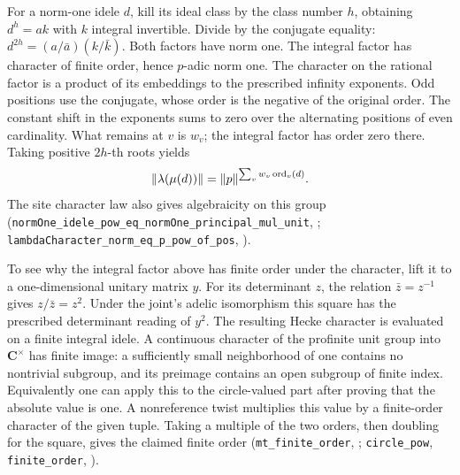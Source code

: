 For a norm-one idele \(d\), kill its ideal class by the class number \(h\), obtaining \(d^h=a k\) with \(k\) integral invertible. Divide by the conjugate equality:
\(d^{2h}=(a/\bar a)(k/\bar k)\). Both factors have norm one. The integral factor has character of finite order, hence \(p\)-adic norm one. The character on the rational factor is a product of its embeddings to the prescribed infinity exponents. Odd positions use the conjugate, whose order is the negative of the original order. The constant shift in the exponents sums to zero over the alternating positions of even cardinality. What remains at \(v\) is \(w_v\); the integral factor has order zero there. Taking positive \(2h\)-th roots yields
\[
\lVert\lambda(\mu(d))\rVert=\lVert p\rVert^{\sum_v w_v\,{\rm ord}_v(d)} .
\]
The site character law also gives algebraicity on this group (\nolinkurl{normOne_idele_pow_eq_normOne_principal_mul_unit}, ; \nolinkurl{lambdaCharacter_norm_eq_p_pow_of_pos}, ).

To see why the integral factor above has finite order under the character, lift it to a one-dimensional unitary matrix \(y\). For its determinant \(z\), the relation \(\bar z=z^{-1}\) gives \(z/\bar z=z^2\). Under the joint's adelic isomorphism this square has the prescribed determinant reading of \(y^2\). The resulting Hecke character is evaluated on a finite integral idele. A continuous character of the profinite unit group into \(\mathbf C^\times\) has finite image: a sufficiently small neighborhood of one contains no nontrivial subgroup, and its preimage contains an open subgroup of finite index. Equivalently one can apply this to the circle-valued part after proving that the absolute value is one. A nonreference twist multiplies this value by a finite-order character of the given tuple. Taking a multiple of the two orders, then doubling for the square, gives the claimed finite order (\nolinkurl{mt_finite_order}, ; \nolinkurl{circle_pow}, \nolinkurl{finite_order}, ).

